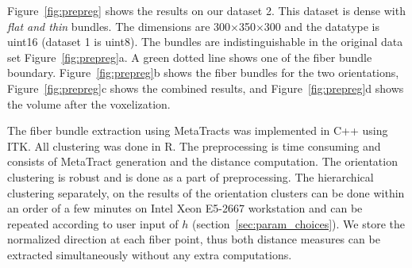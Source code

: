 Figure~\ref{fig:prepreg} shows the results on our dataset 2. This dataset is dense with \textit{flat and thin} bundles. The dimensions are 300$\times$350$\times$300 and the datatype is uint16 (dataset 1 is uint8). The bundles are indistinguishable in the original data set Figure~\ref{fig:prepreg}a. A green dotted line shows one of the fiber bundle boundary. Figure~\ref{fig:prepreg}b shows the fiber bundles for the two orientations, Figure~\ref{fig:prepreg}c shows the combined results, and Figure~\ref{fig:prepreg}d shows the volume after the voxelization.

The fiber bundle extraction using MetaTracts was implemented in C++ using ITK. All clustering was done in R. The preprocessing is time consuming and consists of MetaTract generation and the distance computation. The orientation clustering is robust and is done as a part of preprocessing. The hierarchical clustering separately, on the results of the orientation clusters can be done within an order of a few minutes on Intel Xeon E5-2667 workstation and can be repeated according to user input of $h$ (section~\ref{sec:param_choices}). We store the normalized direction at each fiber point, thus both distance measures can be extracted simultaneously without any extra computations.



